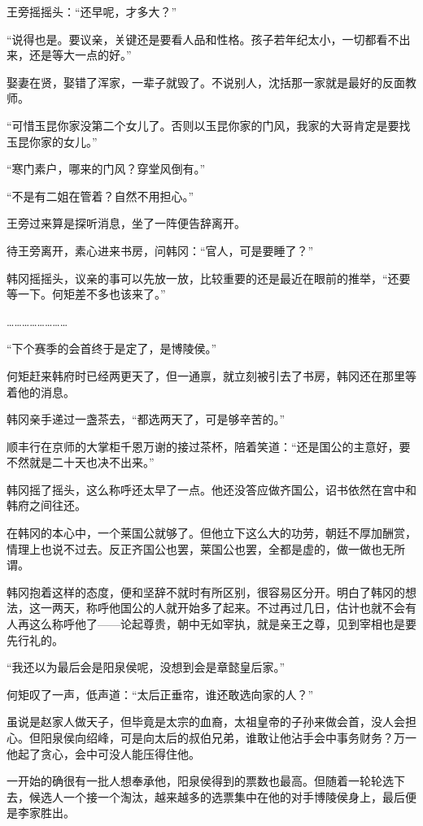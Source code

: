 王旁摇摇头：“还早呢，才多大？”

“说得也是。要议亲，关键还是要看人品和性格。孩子若年纪太小，一切都看不出来，还是等大一点的好。”

娶妻在贤，娶错了浑家，一辈子就毁了。不说别人，沈括那一家就是最好的反面教师。

“可惜玉昆你家没第二个女儿了。否则以玉昆你家的门风，我家的大哥肯定是要找玉昆你家的女儿。”

“寒门素户，哪来的门风？穿堂风倒有。”

“不是有二姐在管着？自然不用担心。”

王旁过来算是探听消息，坐了一阵便告辞离开。

待王旁离开，素心进来书房，问韩冈：“官人，可是要睡了？”

韩冈摇摇头，议亲的事可以先放一放，比较重要的还是最近在眼前的推举，“还要等一下。何矩差不多也该来了。”

……………………

“下个赛季的会首终于是定了，是博陵侯。”

何矩赶来韩府时已经两更天了，但一通禀，就立刻被引去了书房，韩冈还在那里等着他的消息。

韩冈亲手递过一盏茶去，“都选两天了，可是够辛苦的。”

顺丰行在京师的大掌柜千恩万谢的接过茶杯，陪着笑道：“还是国公的主意好，要不然就是二十天也决不出来。”

韩冈摇了摇头，这么称呼还太早了一点。他还没答应做齐国公，诏书依然在宫中和韩府之间往还。

在韩冈的本心中，一个莱国公就够了。但他立下这么大的功劳，朝廷不厚加酬赏，情理上也说不过去。反正齐国公也罢，莱国公也罢，全都是虚的，做一做也无所谓。

韩冈抱着这样的态度，便和坚辞不就时有所区别，很容易区分开。明白了韩冈的想法，这一两天，称呼他国公的人就开始多了起来。不过再过几日，估计也就不会有人再这么称呼他了——论起尊贵，朝中无如宰执，就是亲王之尊，见到宰相也是要先行礼的。

“我还以为最后会是阳泉侯呢，没想到会是章懿皇后家。”

何矩叹了一声，低声道：“太后正垂帘，谁还敢选向家的人？”

虽说是赵家人做天子，但毕竟是太宗的血裔，太祖皇帝的子孙来做会首，没人会担心。但阳泉侯向绍峰，可是向太后的叔伯兄弟，谁敢让他沾手会中事务财务？万一他起了贪心，会中可没人能压得住他。

一开始的确很有一批人想奉承他，阳泉侯得到的票数也最高。但随着一轮轮选下去，候选人一个接一个淘汰，越来越多的选票集中在他的对手博陵侯身上，最后便是李家胜出。

